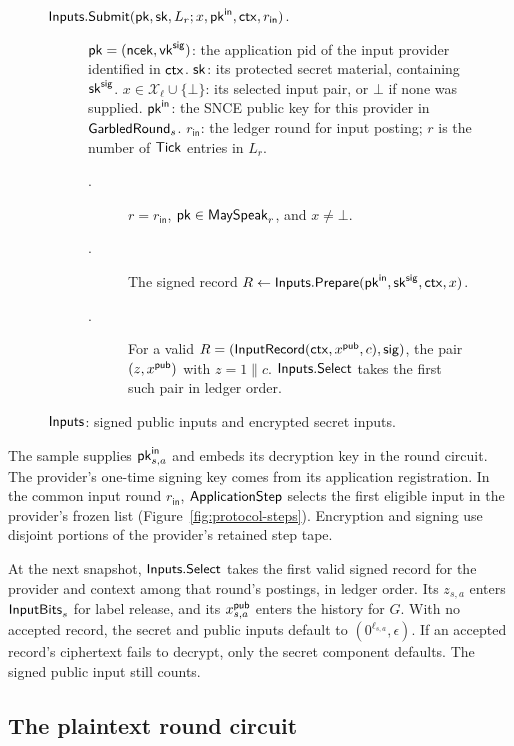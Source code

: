 \begin{figure}[tbp]
{\begin{minipage}{0.95\textwidth}
\begin{description}
  \item[$\mathsf{Inputs}.\mathsf{Submit}(\mathsf{pk},\mathsf{sk},L_r;x,\mathsf{pk}^{\mathsf{in}},\mathsf{ctx},r_{\mathsf{in}})$.]
    $\mathsf{pk}=(\mathsf{ncek},\mathsf{vk}^{\mathsf{sig}})$: the application pid of the input provider
    identified in $\mathsf{ctx}$.
    $\mathsf{sk}$: its protected secret material, containing $\mathsf{sk}^{\mathsf{sig}}$.
    $x\in\mathcal X_\ell\cup\{\bot\}$: its selected input pair, or
    $\bot$ if none was supplied.
    $\mathsf{pk}^{\mathsf{in}}$: the SNCE public key for this provider in $\mathsf{GarbledRound}_s$.
    $r_{\mathsf{in}}$: the ledger round for input posting;
    $r$ is the number of $\mathsf{Tick}$ entries in $L_r$.
    \begin{description}
      \item[\WhenField.]
        $r=r_{\mathsf{in}}$, $\mathsf{pk}\in\mathsf{MaySpeak}_r$, and $x\neq\bot$.
      \item[\WhatField.] The signed record
        $R\gets\mathsf{Inputs}.\mathsf{Prepare}(\mathsf{pk}^{\mathsf{in}},\mathsf{sk}^{\mathsf{sig}},\mathsf{ctx},x)$.
      \item[\ValueField.] For a valid $R=(\mathsf{InputRecord}(\mathsf{ctx},x^{\mathsf{pub}},c),\mathsf{sig})$,
        the pair $(z,x^{\mathsf{pub}})$ with $z=1\mathbin\|c$.  $\mathsf{Inputs}.\mathsf{Select}$
        takes the first such pair in ledger order.
    \end{description}
\end{description}
\end{minipage}}
\caption{$\mathsf{Inputs}$: signed public inputs and encrypted secret inputs.}
\label{fig:signed-encrypted-inputs}
\end{figure}

The sample supplies $\mathsf{pk}^{\mathsf{in}}_{s,a}$ and embeds its decryption key in
the round circuit. The provider's one-time signing key comes from its
application registration. In the common input round $r_{\mathsf{in}}$,
$\mathsf{ApplicationStep}$ selects the first eligible input in the provider's
frozen list (Figure~\ref{fig:protocol-steps}). Encryption and signing
use disjoint portions of the provider's retained step tape.

At the next snapshot, $\mathsf{Inputs}.\mathsf{Select}$ takes the first valid signed record
for the provider and context among that round's postings, in ledger order.
Its $z_{s,a}$ enters $\mathsf{InputBits}_s$ for label release, and its
$x^{\mathsf{pub}}_{s,a}$ enters the history for $G$. With no accepted record, the
secret and public inputs default to $(0^{\ell_{s,a}},\epsilon)$.
If an accepted record's ciphertext fails to decrypt, only the secret
component defaults. The signed public input still counts.

\subsection{The plaintext round circuit}
\label{sec:round-circuit}

